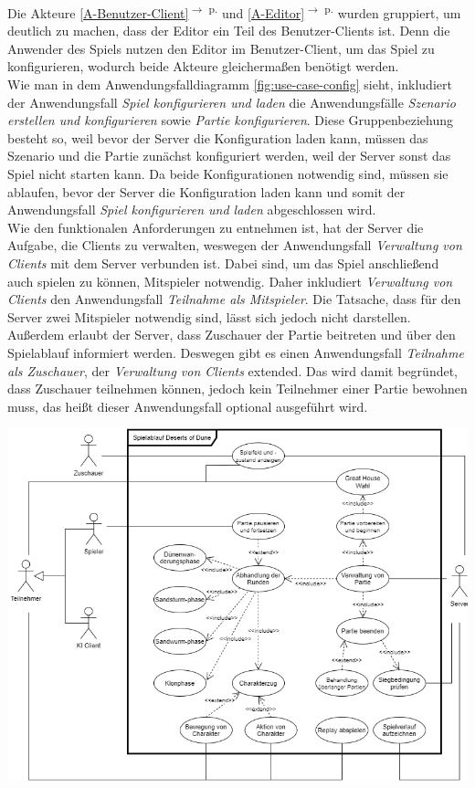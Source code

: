 \documentclass{uulm-assignment}
\newcounter{fa}
\newcommand{\rref}[1]{\ref{#1}\textsuperscript{$\rightarrow$ p. \pageref{#1}}}
\begin{document}
Die Akteure \rref{A-Benutzer-Client} und \rref{A-Editor} wurden gruppiert, um deutlich zu machen, dass der Editor ein Teil des Benutzer-Clients ist. Denn die Anwender des Spiels nutzen den Editor im Benutzer-Client, um das Spiel zu konfigurieren, wodurch beide Akteure gleichermaßen benötigt werden. \\ Wie man in dem Anwendungsfalldiagramm \autoref{fig:use-case-config} sieht, inkludiert der Anwendungsfall \textit{Spiel konfigurieren und laden} die Anwendungsfälle \textit{Szenario erstellen und konfigurieren} sowie \textit{Partie konfigurieren}. Diese Gruppenbeziehung besteht so, weil bevor der Server die Konfiguration laden kann, müssen das Szenario und die Partie zunächst konfiguriert werden, weil der Server sonst das Spiel nicht starten kann. Da beide Konfigurationen notwendig sind, müssen sie ablaufen, bevor der Server die Konfiguration laden kann und somit der Anwendungsfall \textit{Spiel konfigurieren und laden} abgeschlossen wird. \\ Wie den funktionalen Anforderungen zu entnehmen ist, hat der Server die Aufgabe, die Clients zu verwalten, weswegen der Anwendungsfall \textit{Verwaltung von Clients} mit dem Server verbunden ist. Dabei sind, um das Spiel anschließend auch spielen zu können, Mitspieler notwendig. Daher inkludiert \textit{Verwaltung von Clients} den Anwendungsfall \textit{Teilnahme als Mitspieler}. Die Tatsache, dass für den Server zwei Mitspieler notwendig sind, lässt sich jedoch nicht darstellen. Außerdem erlaubt der Server, dass Zuschauer der Partie beitreten und über den Spielablauf informiert werden. Deswegen gibt es einen Anwendungsfall \textit{Teilnahme als Zuschauer}, der \textit{Verwaltung von Clients} extended. Das wird damit begründet, dass Zuschauer teilnehmen können, jedoch kein Teilnehmer einer Partie bewohnen muss, das heißt dieser Anwendungsfall optional ausgeführt wird. 

\centering
\includegraphics[width=\textwidth]{images/Anwendungsfalldiagramm_Spielablauf}
\label{fig:use-case-gameflow}
\end{document}
